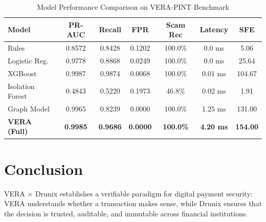 \documentclass[10pt,conference]{IEEEtran}
\begin{document}
\begin{table}[htbp]
\caption{Model Performance Comparison on VERA-PINT Benchmark}
\begin{center}
\begin{tabular}{lcccccc}
\toprule
\textbf{Model} & \textbf{PR-AUC} & \textbf{Recall} & \textbf{FPR} & \textbf{Scam Rec} & \textbf{Latency} & \textbf{SFE} \\
\midrule
Rules & 0.8572 & 0.8428 & 0.1202 & 100.0\% & 0.0 ms & 5.06 \\
Logistic Reg. & 0.9778 & 0.8868 & 0.0249 & 100.0\% & 0.0 ms & 25.64 \\
XGBoost & 0.9987 & 0.9874 & 0.0068 & 100.0\% & 0.01 ms & 104.67 \\
Isolation Forest & 0.4843 & 0.5220 & 0.1973 & 46.8\% & 0.02 ms & 1.91 \\
Graph Model & 0.9965 & 0.8239 & 0.0000 & 100.0\% & 1.25 ms & 131.00 \\
\textbf{VERA (Full)} & \textbf{0.9985} & \textbf{0.9686} & \textbf{0.0000} & \textbf{100.0\%} & \textbf{4.20 ms} & \textbf{154.00} \\
\bottomrule
\end{tabular}
\end{center}
\end{table}

\section{Conclusion}
VERA $\times$ Drunix establishes a verifiable paradigm for digital payment security: VERA understands whether a transaction makes sense, while Drunix ensures that the decision is trusted, auditable, and immutable across financial institutions.



\end{document}
